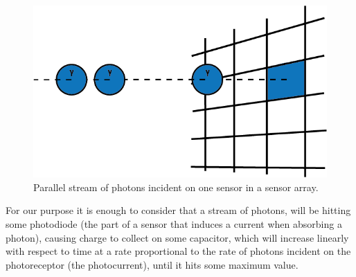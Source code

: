 \documentclass[12pt,twoside,notitlepage]{report}
\begin{document}
            \begin{figure}[H]
                \centering
                \includegraphics[scale=0.5]{photon_stream}
                \caption{Parallel stream of photons incident on one sensor in a sensor array.}
                \label{fig:photon_stream}
            \end{figure}

            For our purpose it is enough to consider that a stream of photons, will be hitting some photodiode (the 
            part of a sensor that induces a current when absorbing a photon), causing charge to collect on some 
            capacitor, which will increase linearly with respect to time at a rate proportional to the rate of photons 
            incident on the photoreceptor (the photocurrent), until it hits some maximum value. \cite{gamal2005cmos}
\end{document}
